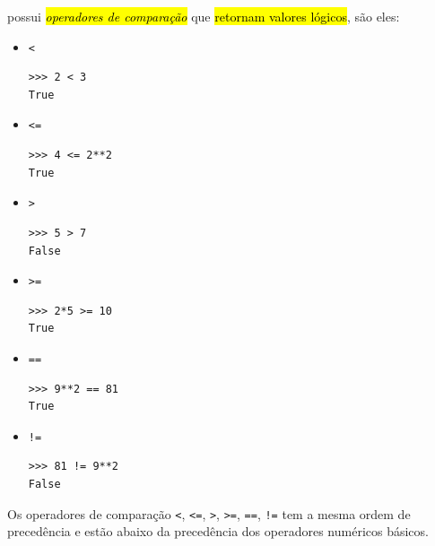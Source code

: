 {\python} possui \hl{\emph{operadores de comparação}} que \hl{retornam valores lógicos}, são eles:
\begin{itemize}
\item \lstinline+<+ 

\begin{lstlisting}[xrightmargin=2.5em]
>>> 2 < 3
True
\end{lstlisting}

\item \lstinline+<=+ 

\begin{lstlisting}[xrightmargin=2.5em]
>>> 4 <= 2**2
True
\end{lstlisting}

\item \lstinline+>+ 

\begin{lstlisting}[xrightmargin=2.5em]
>>> 5 > 7
False
\end{lstlisting}

\item \lstinline+>=+ 

\begin{lstlisting}[xrightmargin=2.5em]
>>> 2*5 >= 10
True
\end{lstlisting}

\item \lstinline+==+ 

\begin{lstlisting}[xrightmargin=2.5em]
>>> 9**2 == 81
True
\end{lstlisting}

\item \lstinline+!=+ 

\begin{lstlisting}[xrightmargin=2.5em]
>>> 81 != 9**2
False
\end{lstlisting}

\end{itemize}

\begin{obs}
  Os operadores de comparação \lstinline+<+, \lstinline+<=+, \lstinline+>+, \lstinline+>=+, \lstinline+==+, \lstinline+!=+ tem a mesma ordem de precedência e estão abaixo da precedência dos operadores numéricos básicos.
\end{obs}

